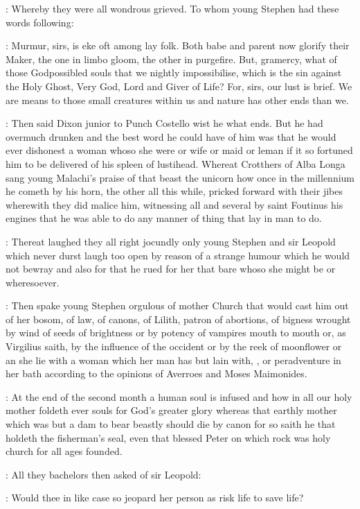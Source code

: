 : Whereby they were all wondrous grieved.
To whom young Stephen had these words following:

\stephen: Murmur, sirs, is eke oft among lay folk. Both babe and parent now
glorify their Maker, the one in limbo gloom, the other in purgefire. But,
gramercy, what of those Godpossibled souls that we nightly impossibilise,
which is the sin against the Holy Ghost, Very God, Lord and Giver of Life?
For, sirs, our lust is brief. We are means to those small creatures within
us and nature has other ends than we.

: Then said Dixon junior to Punch Costello wist he what ends.
But he had overmuch drunken and the best word he could have of him was
that he would ever dishonest a woman whoso she were or wife or maid or
leman if it so fortuned him to be delivered of his spleen of lustihead.
Whereat Crotthers of Alba Longa sang young Malachi's praise of that beast
the unicorn how once in the millennium he cometh by his horn, the other
all this while, pricked forward with their jibes wherewith they did malice
him, witnessing all and several by saint Foutinus his engines that he was
able to do any manner of thing that lay in man to do.

: Thereat laughed they all right jocundly only young Stephen
and sir Leopold which never durst laugh too open by reason of a strange
humour which he would not bewray and also for that he rued for her that
bare whoso she might be or wheresoever.

: Then spake young Stephen orgulous of mother Church that would cast
him out of her bosom, of law, of canons, of Lilith, patron of abortions,
of bigness wrought by wind of seeds of brightness or by potency of
vampires mouth to mouth or, as Virgilius saith, by the influence of the
occident or by the reek of moonflower or an she lie with a woman which her
man has but lain with, , or peradventure in her bath
according to the opinions of Averroes and Moses Maimonides.

\stephen: At the end of the second month a human soul is infused and how in all
our holy mother foldeth ever souls for God's greater glory whereas that
earthly mother which was but a dam to bear beastly should die by canon for
so saith he that holdeth the fisherman's seal, even that blessed Peter on
which rock was holy church for all ages founded.

: All they bachelors then asked of sir Leopold:

\All: Would thee in like case so jeopard her person as risk life to save
life?


